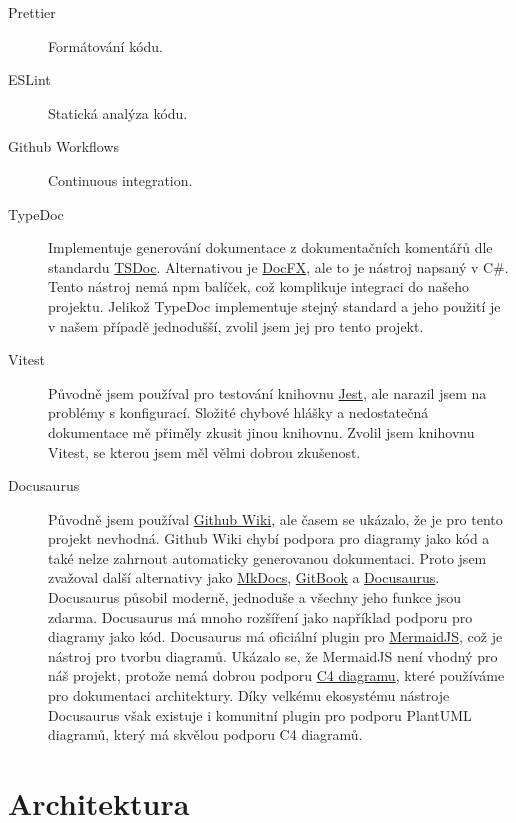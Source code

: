 \begin{description}
    \item[Prettier]
    Formátování kódu.
    \item[ESLint]
    Statická analýza kódu.
    \item[Github Workflows]
    Continuous integration.
    \item[TypeDoc]
    Implementuje generování dokumentace z dokumentačních komentářů dle standardu \href{https://tsdoc.org/}{TSDoc}.
    Alternativou je \href{https://github.com/dotnet/docfx}{DocFX}, ale to je nástroj napsaný v C\#.
    Tento nástroj nemá npm balíček, což komplikuje integraci do našeho projektu.
    Jelikož TypeDoc implementuje stejný standard a jeho použití je v našem případě jednodušší, zvolil jsem jej pro tento projekt.
    \item[Vitest]
    Původně jsem používal pro testování knihovnu \href{https://jestjs.io/}{Jest}, ale narazil jsem na problémy s konfigurací.
    Složité chybové hlášky a nedostatečná dokumentace mě přiměly zkusit jinou knihovnu.
    Zvolil jsem knihovnu Vitest, se kterou jsem měl vělmi dobrou zkušenost.
    \item[Docusaurus]
    Původně jsem používal \href{https://docs.github.com/en/communities/documenting-your-project-with-wikis/about-wikis}{Github Wiki}, ale časem se ukázalo, že je pro tento projekt nevhodná.
    Github Wiki chybí podpora pro diagramy jako kód a také nelze zahrnout automaticky generovanou dokumentaci.
    Proto jsem zvažoval další alternativy jako \href{https://www.mkdocs.org/}{MkDocs}, \href{https://www.gitbook.com/}{GitBook} a \href{https://docusaurus.io/}{Docusaurus}.
    Docusaurus působil moderně, jednoduše a všechny jeho funkce jsou zdarma.
    Docusaurus má mnoho rozšíření jako například podporu pro diagramy jako kód.
    Docusaurus má oficiální plugin pro \href{https://mermaid.js.org/}{MermaidJS}, což je nástroj pro tvorbu diagramů.
    Ukázalo se, že MermaidJS není vhodný pro náš projekt, protože nemá dobrou podporu \href{https://c4model.com/}{C4 diagramu}, které používáme pro dokumentaci architektury.
    Díky velkému ekosystému nástroje Docusaurus však existuje i komunitní plugin pro podporu PlantUML diagramů, který má skvělou podporu C4 diagramů.
\end{description}


\section{Architektura}\label{sec:architektura}


